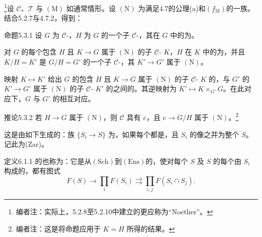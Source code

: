 \footnote{编者注：实际上，5.2.8至5.2.10中建立的更应称为“Noether”。}设 $\mathcal C$、$\mathcal T$ 与 $(\mathrm M)$ 如通常情形。设 $(\mathrm N)$ 为满足4.7的公理(a)和$(f_{\mathrm M})$的一族。结合5.2.7与4.7.2，得到：
\begin{SGAresult}{命题}{5.3.1}
设 $G$ 为 $\mathcal C$-，$H$ 为 $G$ 的一个子 $\mathcal C$-，其在 $G$ 中的为。

对 $G$ 的每个包含 $H$ 且 $K\to G$ 属于 $(\mathrm N)$ 的子 $\mathcal C$- $K$，$H$ 在 $K$ 中的为，并且 $K/H=K'$ 是 $G/H=G'$ 的一个子 $\mathcal C$-，其 $K'\to G'$ 属于 $(\mathrm N)$。

映射 $K\mapsto K'$ 给出 $G$ 的包含 $H$ 且 $K\to G$ 属于 $(\mathrm N)$ 的子 $\mathcal C$- $K$ 的，与 $G'$ 的 $K'\to G'$ 属于 $(\mathrm N)$ 的子 $\mathcal C$- $K'$ 的之间的。其逆映射为 $K'\mapsto K\times_{G'}G$。在此对应下，$G$ 与 $G'$ 的相互对应。
\end{SGAresult}
\begin{SGAresult}{推论}{5.3.2}
若 $H\to G$ 属于 $(\mathrm N)$，则 $\mathcal C$ 具有 $e$，且 $e\to G/H$ 属于 $(\mathrm N)$。\footnote{编者注：这是将命题应用于 $K=H$ 所得的结果。}
\end{SGAresult}
这是由如下生成的：族 $\{S_i\to S\}$ 为，如果每个都是，且 $S_i$ 的像之并为整个 $S$。记此为(Zar)。
\begin{SGAresult}{定义}{6.1.1}
的也称为：它是从$(\mathrm{Sch})$到$(\mathrm{Ens})$的，使对每个 $S$ 及 $S$ 的每个由 $S_i$ 构成的，都有图式
\[
F(S)\longrightarrow\prod_i F(S_i)\rightrightarrows\prod_{i,j}F(S_i\cap S_j).
\]
\end{SGAresult}
